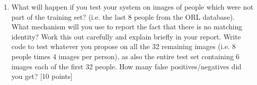 \documentclass[11pt]{article}
\begin{document}
\begin{enumerate}
\item What will happen if you test your system on images of people which were not part of the training set? (i.e. the last 8 people from the ORL database). What mechanism will you use to report the fact that there is no matching identity? Work this out carefully and explain briefly in your report. Write code to test whatever you propose on all the 32 remaining images (i.e. 8 people times 4 images per person), as also the entire test set containing 6 images each of the first 32 people. How many false positives/negatives did you get? \textsf{[10 points]}

\end{enumerate}
\end{document}
